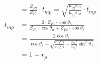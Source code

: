 \begin{equation*}
\begin{aligned}
		& = \frac{Z_{F2}}{Z_{F1}}\cdot t_{mp} = \sqrt{\frac{\mu_{r2}\varepsilon_{r1}}{\mu_{r1}\varepsilon_{r2}}}\cdot t_{mp} 
		\\
		t_{mp} & = \frac{2 \cdot  Z_{F1}\cdot \cos \theta_h}{Z_{F1} \cdot \cos \theta_h+Z_{F2} \cdot \cos \theta_t}                    
\\
		&=\frac{2 \cos \vartheta_1}{\cos \vartheta_1+\sqrt{\frac{\mu_{r 2} \varepsilon_{r 1}}{\mu_{r 1} \varepsilon_{r 2}}-\frac{\varepsilon_{r 1}{ }^2}{\varepsilon_{r 2}{ }^2} \sin ^2 \vartheta_1}}   \\
		&		= 1+r_p
	\end{aligned}
\end{equation*}
